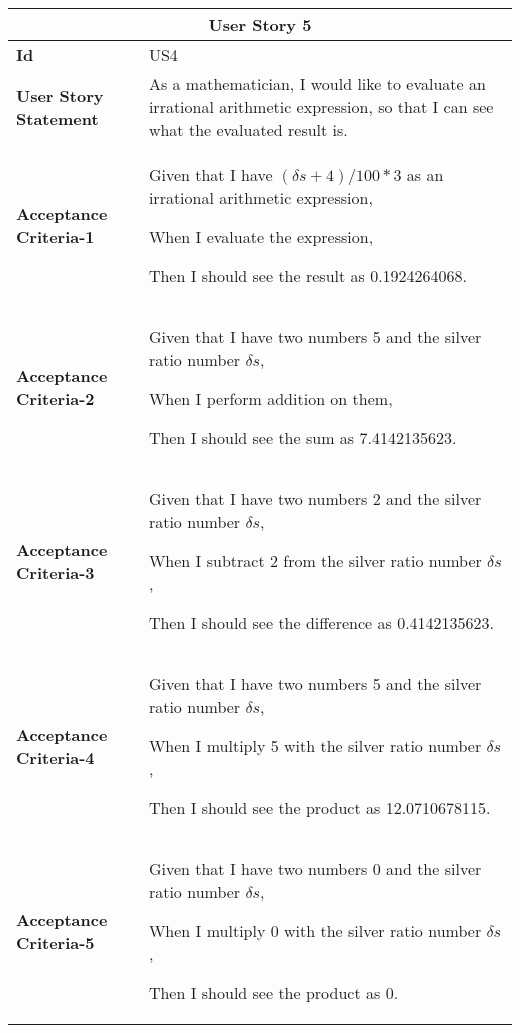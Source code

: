 \hspace{1cm}
\begin{center}
\begin{tabular}{ | m{2.3cm} | m{12cm} | } 

 \hline
 \multicolumn{2}{|c|}{\textbf{User Story 5}} \\

\hline
\textbf{Id} & US4 \\ 

\hline
\textbf{User Story Statement} & As a mathematician, I would like to evaluate an irrational arithmetic expression, so that I can see what the evaluated result is. \\ 

\hline
\textbf{Acceptance Criteria-1} & Given that I have ${(\delta s + 4) / 100 * 3}$ as an irrational arithmetic expression,

When I evaluate the expression,

Then I should see the result as 0.1924264068.\\

\hline
\textbf{Acceptance Criteria-2} & Given that I have two numbers 5 and the silver ratio number $\delta s$,

When I perform addition on them,

Then I should see the sum as 7.4142135623.\\

\hline
\textbf{Acceptance Criteria-3} & Given that I have two numbers 2 and the silver ratio number $\delta s$,

When I subtract 2 from the silver ratio number $\delta s$,

Then I should see the difference as 0.4142135623.\\

\hline
\textbf{Acceptance Criteria-4} & Given that I have two numbers 5 and the silver ratio number $\delta s$,

When I multiply 5 with the silver ratio number $\delta s$,

Then I should see the product as 12.0710678115.\\

\hline
\textbf{Acceptance Criteria-5} & Given that I have two numbers 0 and the silver ratio number $\delta s$,

When I multiply 0 with the silver ratio number $\delta s$,

Then I should see the product as 0.\\


\end{tabular}
\end{center}
